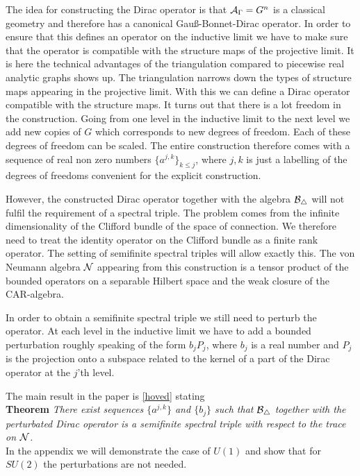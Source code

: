 \documentclass[12pt]{article}
\def\ca{{\cal A}}
\def\cb{{\cal B}}
\def\cn{{\cal N}}
\begin{document}
The idea for constructing the Dirac operator is  that $\ca_\Gamma =G^n$ is a classical geometry and therefore has a canonical Gau\ss-Bonnet-Dirac operator. In order to ensure that this defines an operator on the inductive limit we have to make sure that the operator is compatible with the structure maps of the projective limit. It is here the technical advantages of the triangulation compared to piecewise real analytic graphs shows up. The triangulation narrows down the types of structure maps appearing in the projective limit. With this we can  define a Dirac operator compatible with the structure maps. It turns out that there is a lot freedom in the construction. Going from one level in the inductive limit to the next level we add new copies of $G$ which corresponds to new degrees of freedom. Each of these degrees of freedom can be scaled. The entire construction therefore comes with a sequence of real non zero numbers $\{ a^{j,k}\}_{k\leq j}$, where $j,k$ is just a labelling of the degrees of freedoms convenient for the explicit construction. 

However, the constructed Dirac operator together with the algebra $\cb_\triangle$  will not fulfil the requirement of a spectral triple. The problem comes from the infinite dimensionality of the Clifford bundle of the space of connection. We therefore need to treat the identity operator on the Clifford bundle as a finite rank operator. The setting of  semifinite spectral triples will allow exactly this. The von Neumann algebra $\cn$ appearing from this construction  is a tensor product of the bounded operators on a separable Hilbert space and the weak closure of the CAR-algebra. 

In order to obtain a semifinite spectral triple we still need to perturb the operator. At each level in the inductive limit we have to add a bounded perturbation roughly speaking of the form  $b_jP_j$, where $b_j$ is a real number and $P_j$ is the projection onto a subspace related to the kernel of a part of the Dirac operator at the $j$'th level. 

The main result in the paper is \ref{hoved} stating\\
\textbf{Theorem}\textit{
There exist sequences $\{ a^{j,k} \}$ and $\{ b_j\}$ such that $\cb_\triangle$ together with the perturbated Dirac operator  is a semifinite spectral triple with respect to the trace on $\cn$.}\\

In the appendix we will demonstrate the case of $U(1)$ and show that for $SU(2)$ the perturbations are not needed.\\
\end{document}
